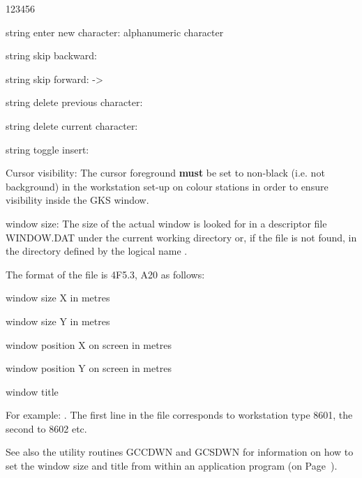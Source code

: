 \begin{DLtt}{123456}
\item[string enter new character:]alphanumeric character
\item[string skip backward:]\Lit{<-}
\item[string skip forward:]->
\item[string delete previous character:]
\item[string delete current character:]
\item[string toggle insert:]
\item[Cursor visibility:]The cursor foreground {\bf must} be set to
non-black (i.e. not background) in the workstation set-up on colour
stations in order to ensure visibility inside the GKS window.
\item[window size:]The size of the actual window is looked for in a descriptor
file WINDOW.DAT under the current working directory or, if the file is
not found, in the directory defined by the logical name .
 
The format of the file is 4F5.3, A20 as follows:
\begin{OL}
\item window size X in metres
\item window size Y in metres
\item window position X on screen in metres
\item window position Y on screen in metres
\item window title
\end{OL}
For example: .
The first line in the file corresponds to workstation type 8601,
the second to 8602 etc.
 
See also the utility routines GCCDWN and GCSDWN for information on
how to set the window size and title from within an application
program (on Page~\pageref{sec:vstnref}).
\end{DLtt}
